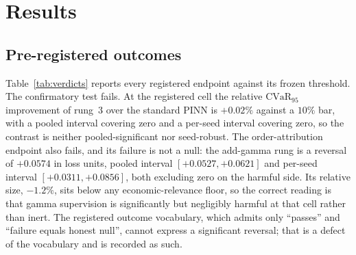 \documentclass[10pt]{article}
\begin{document}
\section{Results}
\label{sec:results}

\subsection{Pre-registered outcomes}
\label{sec:reg}

Table~\ref{tab:verdicts} reports every registered endpoint against its frozen
threshold. The confirmatory test fails. At the registered cell the relative
$\mathrm{CVaR}_{95}$ improvement of rung~3 over the standard PINN is $+0.02\%$
against a $10\%$ bar, with a pooled interval covering zero and a per-seed interval
covering zero, so the contrast is neither pooled-significant nor seed-robust. The
order-attribution endpoint also fails, and its failure is not a null: the add-gamma
rung is a reversal of $+0.0574$ in loss units, pooled interval $[+0.0527,+0.0621]$
and per-seed interval $[+0.0311,+0.0856]$, both excluding zero on the harmful side.
Its relative size, $-1.2\%$, sits below any economic-relevance floor, so the correct
reading is that gamma supervision is significantly but negligibly harmful at that
cell rather than inert. The registered outcome vocabulary, which admits only
``passes'' and ``failure equals honest null'', cannot express a significant
reversal; that is a defect of the vocabulary and is recorded as such.
\end{document}

